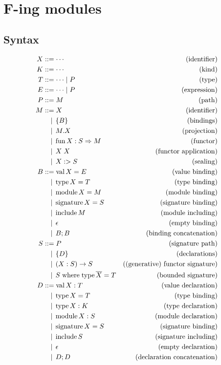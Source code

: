 \section{F-ing modules}

\cite{Rossberg:2014}

\subsection{Syntax}

\begin{align*}
  X &\BNFassign \cdots &(\text{identifier}) \\
  K &\BNFassign \cdots &(\text{kind}) \\
  T &\BNFassign \cdots \mid P &(\text{type}) \\
  E &\BNFassign \cdots \mid P &(\text{expression}) \\
  P &\BNFassign M &(\text{path}) \\
  M
  &\BNFassign X &(\text{identifier}) \\
  &\BNFor \{ B \} &(\text{bindings}) \\
  &\BNFor M.X &(\text{projection}) \\
  &\BNFor \symfun X: S \Rightarrow M &(\text{functor}) \\
  &\BNFor X\; X &(\text{functor application}) \\
  &\BNFor X :> S &(\text{sealing}) \\
  B
  &\BNFassign \symval X = E &(\text{value binding}) \\
  &\BNFor \symtype X = T &(\text{type binding}) \\
  &\BNFor \symmodule X = M &(\text{module binding}) \\
  &\BNFor \symsignature X = S &(\text{signature binding}) \\
  &\BNFor \syminclude M &(\text{module including}) \\
  &\BNFor \epsilon &(\text{empty binding}) \\
  &\BNFor B; B &(\text{binding concatenation}) \\
  S
  &\BNFassign P &(\text{signature path}) \\
  &\BNFor \{ D \} &(\text{declarations}) \\
  &\BNFor (X: S) \to S &(\text{(generative) functor signature}) \\
  &\BNFor S \symwhere \symtype \overline{X} = T &(\text{bounded signature}) \\
  D
  &\BNFassign \symval X: T &(\text{value declaration}) \\
  &\BNFor \symtype X = T &(\text{type binding}) \\
  &\BNFor \symtype X: K &(\text{type declaration}) \\
  &\BNFor \symmodule X: S &(\text{module declaration}) \\
  &\BNFor \symsignature X = S &(\text{signature binding}) \\
  &\BNFor \syminclude S &(\text{signature including}) \\
  &\BNFor \epsilon &(\text{empty declaration}) \\
  &\BNFor D; D &(\text{declaration concatenation})
\end{align*}

